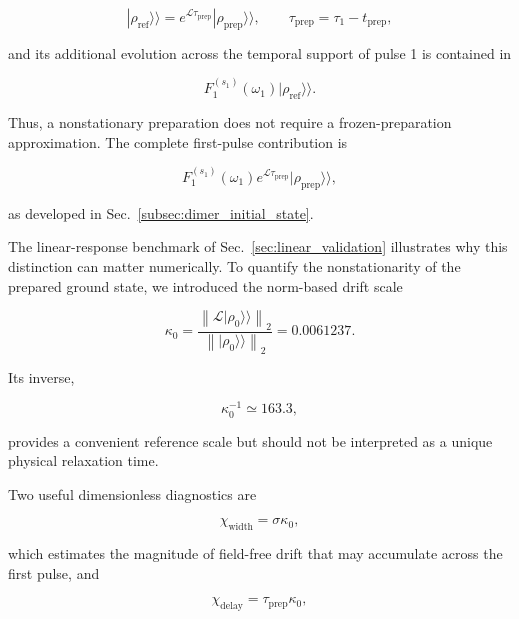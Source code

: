 \documentclass[11pt]{article}
\begin{document}
\begin{equation}
|\rho_{\mathrm{ref}}\rangle\rangle
=
e^{\mathcal{L}\tau_{\mathrm{prep}}}
|\rho_{\mathrm{prep}}\rangle\rangle,
\qquad
\tau_{\mathrm{prep}}
=
\tau_1-t_{\mathrm{prep}},
\end{equation}

and its additional evolution across the temporal support of pulse 1 is
contained in

\begin{equation}
F_1^{(s_1)}(\omega_1)
|\rho_{\mathrm{ref}}\rangle\rangle.
\end{equation}

Thus, a nonstationary preparation does not require a
frozen-preparation approximation. The complete first-pulse contribution
is

\begin{equation}
\boxed{
F_1^{(s_1)}(\omega_1)
e^{\mathcal{L}\tau_{\mathrm{prep}}}
|\rho_{\mathrm{prep}}\rangle\rangle,
}
\end{equation}

as developed in Sec.~\ref{subsec:dimer_initial_state}.

The linear-response benchmark of
Sec.~\ref{sec:linear_validation} illustrates why this distinction can
matter numerically. To quantify the nonstationarity of the prepared
ground state, we introduced the norm-based drift scale

\begin{equation}
\kappa_0
=
\frac{
\left\|
\mathcal{L}
|\rho_0\rangle\rangle
\right\|_2
}{
\left\|
|\rho_0\rangle\rangle
\right\|_2
}
=
0.0061237.
\end{equation}

Its inverse,

\begin{equation}
\kappa_0^{-1}
\simeq
163.3,
\end{equation}

provides a convenient reference scale but should not be interpreted as
a unique physical relaxation time.

Two useful dimensionless diagnostics are

\begin{equation}
\chi_{\mathrm{width}}
=
\sigma\kappa_0,
\end{equation}

which estimates the magnitude of field-free drift that may accumulate
across the first pulse, and

\begin{equation}
\chi_{\mathrm{delay}}
=
\tau_{\mathrm{prep}}\kappa_0,
\end{equation}
\end{document}
